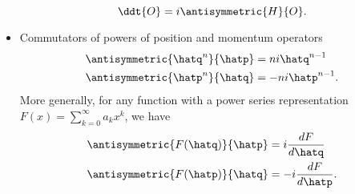 \begin{itemize}
\begin{dmath}\label{eqn:usefulFormulas:220}
\ddt{O} = i \antisymmetric{H}{O}.
\end{dmath}
\item Commutators of powers of position and momentum operators
\begin{dmath}\label{eqn:usefulFormulas:240}
\begin{aligned}
\antisymmetric{\hatq^n}{\hatp} &= n i \hatq^{n-1} \\
\antisymmetric{\hatp^n}{\hatq} &= -n i \hatp^{n-1}.
\end{aligned}
\end{dmath}
More generally, for any function with a power series representation \( F(x) = \sum_{k = 0}^\infty a_k x^k \), we have
\begin{dmath}\label{eqn:usefulFormulas:260}
\begin{aligned}
\antisymmetric{F(\hatq)}{\hatp} &= i \frac{dF}{d\hatq} \\
\antisymmetric{F(\hatp)}{\hatq} &= -i \frac{dF}{d\hatp}.
\end{aligned}
\end{dmath}
\end{itemize}
